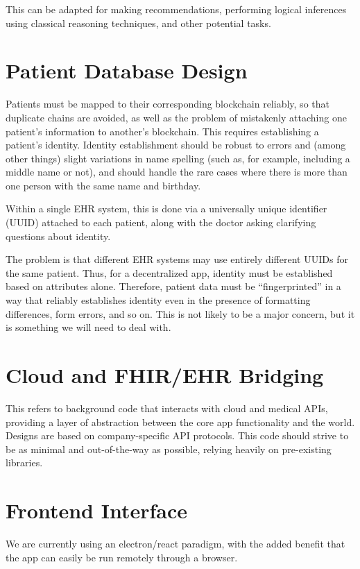 \documentclass[12pt]{article}
\begin{document}
This can be adapted for making recommendations, performing logical inferences using classical reasoning techniques, and other potential tasks.


\section{Patient Database Design}
Patients must be mapped to their corresponding blockchain reliably, so that duplicate chains are avoided, as well as the problem of mistakenly attaching one patient's information to another's blockchain. This requires establishing a patient's identity. Identity establishment should be robust to errors and (among other things) slight variations in name spelling (such as, for example, including a middle name or not), and should handle the rare cases where there is more than one person with the same name and birthday.

Within a single EHR system, this is done via a universally unique identifier (UUID) attached to each patient, along with the doctor asking clarifying questions about identity.

The problem is that different EHR systems may use entirely different UUIDs for the same patient. Thus, for a decentralized app, identity must be established based on attributes alone. Therefore, patient data must be ``fingerprinted'' in a way that reliably establishes identity even in the presence of formatting differences, form errors, and so on. This is not likely to be a major concern, but it is something we will need to deal with.


\section{Cloud and FHIR/EHR Bridging}

This refers to background code that interacts with cloud and medical APIs, providing a layer of abstraction between the core app functionality and the world. Designs are based on company-specific API protocols. This code should strive to be as minimal and out-of-the-way as possible, relying heavily on pre-existing libraries.

\section{Frontend Interface}

We are currently using an electron/react paradigm, with the added benefit that the app can easily be run remotely through a browser.
\end{document}

